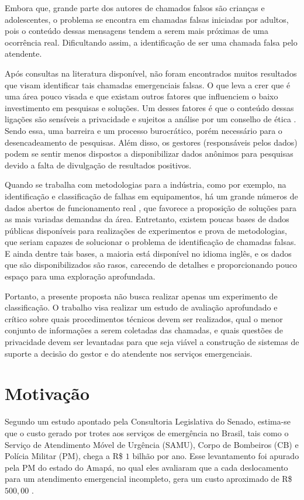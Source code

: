 Embora que, grande parte dos autores de chamados falsos são crianças e adolescentes, o problema se encontra em chamadas falsas iniciadas por adultos, pois o conteúdo dessas mensagens tendem a serem mais próximas de uma ocorrência real. Dificultando assim, a identificação de ser uma chamada falsa pelo atendente.

Após consultas na literatura disponível, não foram encontrados muitos resultados que visam identificar tais chamadas emergenciais falsas. O que leva a crer que é uma área pouco visada e que existam outros fatores que influenciem o baixo investimento em pesquisas e soluções. Um desses fatores é que o conteúdo dessas ligações são sensíveis a privacidade e sujeitos a análise por um conselho de ética \citep{francisconi1998aspectos}. Sendo essa, uma barreira e um processo burocrático, porém necessário para o desencadeamento de pesquisas. Além disso, os gestores (responsáveis pelos dados) podem se sentir menos dispostos a disponibilizar dados anônimos para pesquisas devido a falta de divulgação de resultados positivos.

Quando se trabalha com metodologias para a indústria, como por exemplo, na identificação e classificação de falhas em equipamentos, há um grande números de dados abertos de funcionamento real \citep{phmsociety2009datasets, nasa2007datasets, uci2017datasets}, que favorece a proposição de soluções para as mais variadas demandas da área. Entretanto, existem poucas bases de dados públicas disponíveis para realizações de experimentos e prova de metodologias, que seriam capazes de solucionar o problema de identificação de chamadas falsas. E ainda dentre tais bases, a maioria está disponível no idioma inglês, e os dados que são disponibilizados são rasos, carecendo de detalhes e proporcionando pouco espaço para uma exploração aprofundada.

Portanto, a presente proposta não busca realizar apenas um experimento de classificação. O trabalho visa realizar um estudo de avaliação aprofundado e crítico sobre quais procedimentos técnicos devem ser realizados, qual o menor conjunto de informações a serem coletadas das chamadas, e quais questões de privacidade devem ser levantadas para que seja viável a construção de sistemas de suporte a decisão do gestor e do atendente nos serviços emergenciais.

\section{Motivação}
Segundo um estudo apontado pela Consultoria Legislativa do Senado, estima-se que o custo gerado por trotes aos serviços de emergência no Brasil, tais como o Serviço de Atendimento Móvel de Urgência (SAMU), Corpo de Bombeiros (CB) e Polícia Militar (PM), chega a R\$ $1$ bilhão por ano. Esse levantamento foi apurado pela PM do estado do Amapá, no qual eles avaliaram que a cada deslocamento para um atendimento emergencial incompleto, gera um custo aproximado de R\$ $500,00$ \citep{globo2014trotes, peixoto2015combate}.


